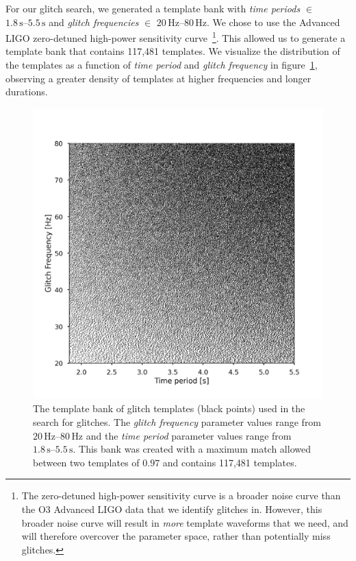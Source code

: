 For our \scl{} glitch search, we generated a template bank with \emph{time periods} $\in$ $1.8 \, \text{s}\text{--}5.5 \, \text{s}$ and \emph{glitch frequencies} $\in$ $20 \, \text{Hz}\text{--} 80 \, \text{Hz}$. We chose to use the Advanced LIGO zero-detuned high-power sensitivity curve~\cite{aLIGO_design_curve:2018}\footnote{The zero-detuned high-power sensitivity curve is a broader noise curve than the O3 Advanced LIGO data that we identify \scl{} glitches in. However, this broader noise curve will result in \emph{more} template waveforms that we need, and will therefore overcover the parameter space, rather than potentially miss \scl{} glitches.}. This allowed us to generate a template bank that contains 117,481 templates. We visualize the distribution of the templates as a function of \emph{time period} and \emph{glitch frequency} in figure~\ref{4:fig:sq_bank}, observing a greater density of templates at higher frequencies and longer durations.

\begin{figure}
  \centering
  \includegraphics[width=1.0\textwidth]{images/4_archenemy/Section3/3.2/template_bank_square.pdf}
  \caption{The template bank of \scl{} glitch templates (black points) used in the search for \scl{} glitches. The \emph{glitch frequency} parameter values range from $20 \, \text{Hz}\text{--} 80 \, \text{Hz}$ and the \emph{time period} parameter values range from $1.8 \, \text{s}\text{--} 5.5 \, \text{s}$. This bank was created with a maximum match allowed between two templates of $0.97$ and contains 117,481 templates.}
  \label{4:fig:sq_bank}
\end{figure}

